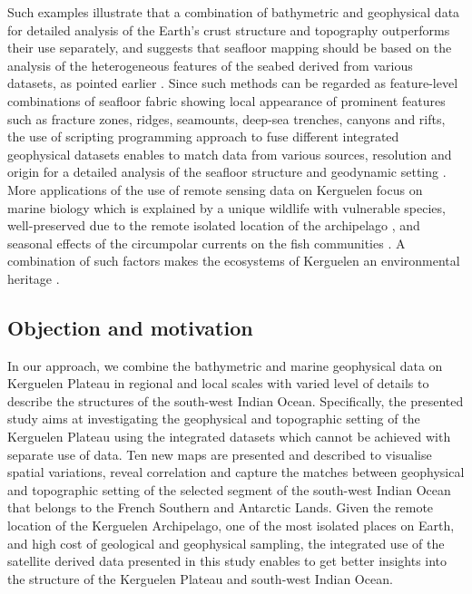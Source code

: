 \documentclass[land,article,submit,pdftex,moreauthors]{Definitions/mdpi}
\begin{document}
Such examples illustrate that a combination of bathymetric and geophysical data for detailed analysis of the Earth's crust structure and topography outperforms their use separately, and suggests that seafloor mapping should be based on the analysis of the heterogeneous features of the seabed derived from various datasets, as pointed earlier \cite{COWLEY2004267,Lemenkova202125,1993A234,ABUAMARAH2019868}. Since such methods can be regarded as feature-level combinations of seafloor fabric showing local appearance of prominent features such as fracture zones, ridges, seamounts, deep-sea trenches, canyons and rifts, the use of scripting programming approach to fuse different integrated geophysical datasets enables to match data from various sources, resolution and origin for a detailed analysis of the seafloor structure and geodynamic setting \cite{Veevers1991b,Lemenkova202104,Hill}. More applications of the use of remote sensing data on Kerguelen focus on marine biology which is explained by a unique wildlife with vulnerable species, well-preserved due to the remote isolated location of the archipelago \cite{fishes8040174}, and seasonal effects of the circumpolar currents on the fish communities \cite{Damerell,MONGIN2008880,Park}. A combination of such factors makes the ecosystems of Kerguelen an environmental heritage \cite{Sombetzkib,Sombetzkia,Naim}. 

\subsection{Objection and motivation}

In our approach, we combine the bathymetric and marine geophysical data on Kerguelen Plateau in regional and local scales with varied level of details to describe the structures of the south-west Indian Ocean. Specifically, the presented study aims at investigating the geophysical and topographic setting of the Kerguelen Plateau using the integrated datasets which cannot be achieved with separate use of data. Ten new maps are presented and described to visualise spatial variations, reveal correlation and capture the matches between geophysical and topographic setting of the selected segment of the south-west Indian Ocean that belongs to the French Southern and Antarctic Lands. Given the remote location of the Kerguelen Archipelago, one of the most isolated places on Earth, and high cost of geological and geophysical sampling, the integrated use of the satellite derived data presented in this study enables to get better insights into the structure of the Kerguelen Plateau and south-west Indian Ocean.
\end{document}
